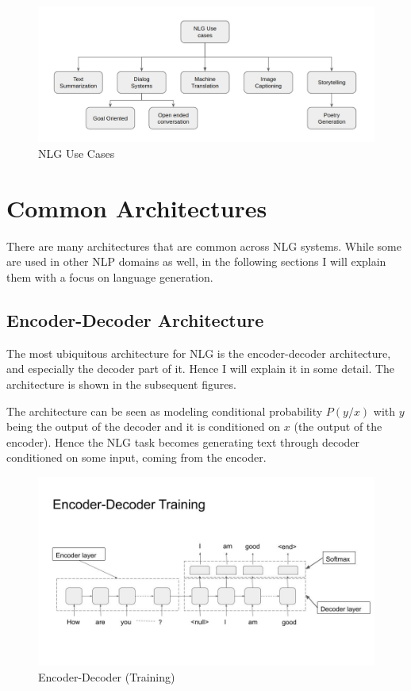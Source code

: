 \documentclass[]{krantz}
\begin{document}
\begin{figure}
\centering
\includegraphics{figures/04-01-use-case1/nlg_use_cases.png}
\caption{NLG Use Cases}
\end{figure}

\hypertarget{common-architectures}{%
\section{Common Architectures}\label{common-architectures}}

There are many architectures that are common across NLG systems. While some are used in other NLP domains as well, in the following sections I will explain them with a focus on language generation.

\hypertarget{encoder-decoder-architecture}{%
\subsection{Encoder-Decoder Architecture}\label{encoder-decoder-architecture}}

The most ubiquitous architecture for NLG is the encoder-decoder architecture, and especially the decoder part of it. Hence I will explain it in some detail. The architecture is shown in the subsequent figures.

The architecture can be seen as modeling conditional probability \(P(y/x)\) with \(y\) being the output of the decoder and it is conditioned on \(x\) (the output of the encoder). Hence the NLG task becomes generating text through decoder conditioned on some input, coming from the encoder.

\begin{figure}
\centering
\includegraphics{figures/04-01-use-case1/encoder_decoder_trg.jpg}
\caption{Encoder-Decoder (Training)}
\end{figure}
\end{document}
